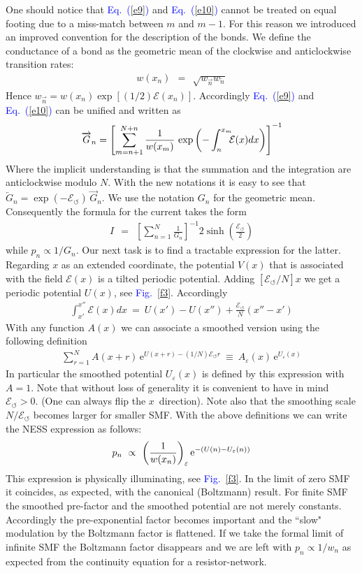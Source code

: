 \documentclass[aps,pre,floats,floatfix,twocolumn]{revtex4}
\newcommand{\eexp}{\mbox{e}^}
\newcommand{\mylabel}[1]{\label{#1}}
\newcommand{\beq}{\begin{eqnarray}}
\newcommand{\eeq}{\end{eqnarray}}
\newcommand{\be}[1]{\begin{eqnarray}\ifthenelse{#1=-1}
{\nonumber}{\ifthenelse{#1=0}{}{\mylabel{e#1}}}}
\newcommand{\Eq}[1]{\textcolor{blue}{Eq.\!\!~(\ref{#1})}}
\newcommand{\Fig}[1]{\textcolor{blue}{Fig.}\!\!~\ref{#1}}
\newcommand{\rmrk}[1]{{#1}}    %
\begin{document}
\rmrk{One should notice that \Eq{e9} and \Eq{e10} cannot 
be treated on equal footing due to a miss-match 
between $m$ and $m{-}1$. For this reason 
we introduced an improved convention for the description 
of the bonds.}  
We define the conductance of a bond as the geometric mean 
of the clockwise and anticlockwise transition rates: 
%
\beq  
w(x_n) \ \ = \ \ \sqrt{ w_{\overrightarrow{n}} w_{\overleftarrow{n}} }
\eeq
%
Hence $w_{\overrightarrow{n}} = w(x_n) \exp[(1/2)\mathcal{E}(x_n)]$.
Accordingly  \Eq{e9} and \Eq{e10} \rmrk{can be unified and written as} 
%
%
\be{13}
\overrightarrow{G}_n = \left[ \sum_{m=n+1}^{N+n} \frac{1}{w(x_m)} 
\,\exp\left(-\int_{n}^{x_m} \!\!\!\mathcal{E}(x)dx \right) \right]^{-1} 
\eeq
%
Where the implicit understanding is that the summation and the integration 
are anticlockwise modulo $N$. With the new notations it is easy to see 
that ${\overleftarrow{G}_n = \exp(-\mathcal{E}_{\circlearrowleft}) \, \overrightarrow{G}_n}$.
We use the notation $G_n$ for the geometric mean. Consequently 
the formula for the current takes the form 
%
\beq
I \ \ = \ \ \left[\sum_{n=1}^N \frac{1}{G_n}\right]^{-1} 2\sinh\left(\frac{\mathcal{E}_{\circlearrowleft}}{2}\right)
\eeq 
%
while $p_n\propto 1/G_n$. Our next task is to find a tractable
expression for the latter. Regarding $x$ as an extended coordinate, 
the potential $V(x)$ that is associated with the field $\mathcal{E}(x)$ 
is a tilted periodic potential. Adding $[\mathcal{E}_{\circlearrowleft}/N] x$
we get a periodic potential $U(x)$, see \Fig{f3}. Accordingly 
%
\beq
\int_{x'}^{x''} \!\!\!\mathcal{E}(x)dx \ = \ U(x'){-}U(x'') + \frac{\mathcal{E}_{\circlearrowleft}}{N}(x''{-}x')
\eeq  
%
With any function $A(x)$ we can associate a smoothed version 
using the following definition  
%
\beq
\sum_{r=1}^N A(x{+}r) \, \eexp{U(x{+}r)- (1/N)\mathcal{E}_{\circlearrowleft}r} \ \equiv \ A_{\varepsilon}(x) \, \eexp{U_{\varepsilon}(x)} 
\eeq
%
In particular the smoothed potential $U_{\varepsilon}(x)$ is defined by this expression with ${A=1}$. 
Note that without loss of generality it is convenient to have 
in mind ${\mathcal{E}_{\circlearrowleft}>0}$. (One can always flip the $x$~direction).  
Note also that the smoothing scale $N/\mathcal{E}_{\circlearrowleft}$ becomes larger for smaller SMF.
With the above definitions we can write the NESS expression as follows:
%
\be{17}
p_n \ \propto \ \left( \frac{1}{w(x_n)} \right)_{\varepsilon} \eexp{-(U(n)-U_{\varepsilon}(n))}
\eeq
%
This expression is physically illuminating, see \Fig{f3}. 
In the limit of zero SMF it coincides, as expected, 
with the canonical (Boltzmann) result. 
For finite SMF the smoothed pre-factor and the smoothed potential
are not merely constants. Accordingly the pre-exponential factor
becomes important and the ``slow" modulation by the Boltzmann factor 
is flattened. If we take the formal limit of infinite SMF 
the Boltzmann factor disappears and we are left with ${p_n \propto 1/w_n}$    
as expected from the continuity equation for a resistor-network. 
\end{document}
